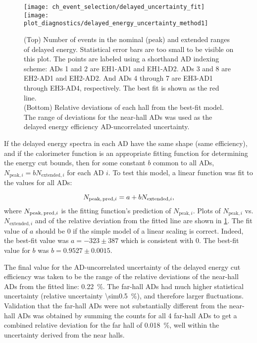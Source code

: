 \begin{figure}
    \centering
    \texttt{[image: ch\_event\_selection/delayed\_uncertainty\_fit]}\\
    \texttt{[image: plot\_diagnostics/delayed\_energy\_uncertainty\_method1]}
    \caption[Delayed energy efficiency uncertainty]{
        (Top) Number of events in the nominal (peak)
        and extended ranges of delayed energy.
        Statistical error bars are too small to be visible on this plot.
        The points are labeled using a shorthand AD indexing scheme:
        ADs 1 and 2 are EH1-AD1 and EH1-AD2. ADs 3 and 8 are EH2-AD1 and EH2-AD2.
        And ADs 4 through 7 are EH3-AD1 through EH3-AD4, respectively.
        The best fit is shown as the red line.\\
        (Bottom) Relative deviations of each hall from the best-fit model.
        The range of deviations for the near-hall ADs
        was used as the delayed energy efficiency AD-uncorrelated uncertainty.
    }
    \label{fig:delayed_eff_unc_fit}
\end{figure}


If the delayed energy spectra in each AD have the same shape (same efficiency),
and if the calorimeter function is an appropriate fitting function
for determining the energy cut bounds,
then for some constant $b$ common to all ADs,
$N_{\text{peak},i} = b N_{\text{extended},i}$ for each AD $i$.
To test this model, a linear function was fit
to the values for all ADs:

\begin{equation}
    N_{\text{peak,\,pred},i} = a + b N_{\text{extended},i},
\end{equation}
where $N_{\text{peak,\,pred},i}$ is the fitting function's prediction
of $N_{\text{peak},i}$.
Plots of $N_{\text{peak},i}$ vs. $N_{\text{extended},i}$ and of the
relative deviation from the fitted line are shown in \cref{fig:delayed_eff_unc_fit}.
The fit value of $a$ should be $0$ if the simple model of
a linear scaling is correct.
Indeed, the best-fit value was $a = -323 \pm 387$
which is consistent with $0$.
The best-fit value for $b$ was $b = 0.9527 \pm 0.0015$.

The final value for the AD-uncorrelated uncertainty
of the delayed energy cut efficiency was taken to be
the range of the relative deviations
of the near-hall ADs from the fitted line: \SI{0.22}{\percent}.
The far-hall ADs had much higher statistical uncertainty
(relative uncertainty \SI{\sim0.5}{\percent}),
and therefore larger fluctuations.
Validation that the far-hall ADs were not
substantially different from the near-hall ADs was obtained by
summing the counts for all 4 far-hall ADs to get
a combined relative deviation for the far hall of \SI{0.018}{\percent},
well within the uncertainty derived from the near halls.

